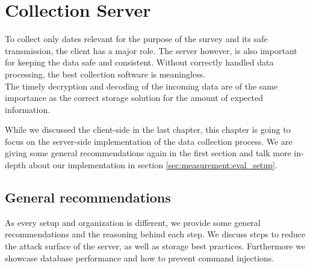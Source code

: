 \chapter{Collection Server}
\label{chap:mmeasurement}
To collect only dates relevant for the purpose of the survey and its safe transmission, the client has a major role. The server however, is also important for keeping the data safe and consistent. Without correctly handled data processing, the best collection software is meaningless.\\
The timely decryption and decoding of the incoming data are of the same importance as the correct storage solution for the amount of expected information.

While we discussed the client-side in the last chapter, this chapter is going to focus on
the server-side implementation of the data collection process. 
We are giving some general recommendations again in the first section and talk more in-depth about our implementation in section \ref{sec:measurement:eval_setup}.
%


\section{General recommendations}
    \label{sec:measurement:limits}
%
    As every setup and organization is different, we provide some general recommendations and the reasoning behind each step. We discuss steps to reduce the attack surface of the server, as well as storage best practices. Furthermore we showcase database performance and how to prevent command injections.
    

